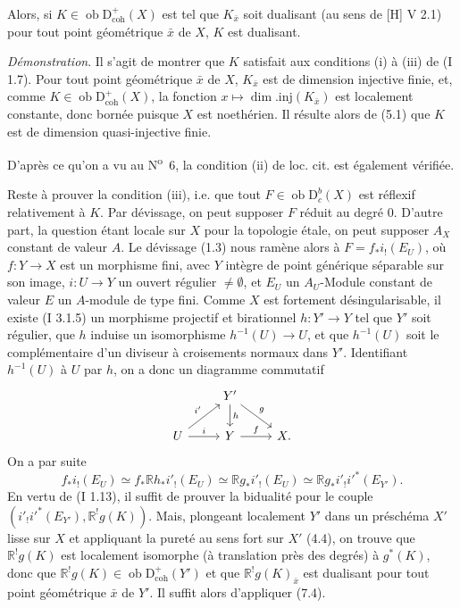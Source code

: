 \documentclass[11pt]{article}
\newcommand{\R}{\mathbb{R}}\newcommand{\RHomCore}{\mathbb{R}\mathrm{Hom}}
\newcommand{\D}{\mathrm{D}}
\newcommand{\ob}{\operatorname{ob}}
\providecommand{\ob}{\operatorname{ob}}
\providecommand{\R}{\mathrm R}
\begin{document}
Alors, si $K\in\ob\D^{+}_{\mathrm{coh}}(X)$ est tel que $K_{\bar{x}}$ soit dualisant (au sens de [H] V 2.1) pour tout point géométrique $\bar{x}$ de $X$, $K$ est dualisant.

\emph{Démonstration}. Il s'agit de montrer que $K$ satisfait aux conditions (i) à (iii) de (I 1.7). Pour tout point géométrique $\bar{x}$ de $X$, $K_{\bar{x}}$ est de
dimension injective finie, et, comme $K\in\ob\D^{+}_{\mathrm{coh}}(X)$, la fonction $x\mapsto \dim.\mathrm{inj}(K_{\bar{x}})$ est localement constante, donc bornée puisque $X$ est noethérien. Il résulte alors de (5.1) que $K$ est de dimension quasi-injective finie.

D'après ce qu'on a vu au N\textsuperscript{o}~6, la condition (ii) de loc. cit. est également vérifiée.

Reste à prouver la condition (iii), i.e. que tout $F\in\ob\D_c^b(X)$ est réflexif relativement à $K$. Par dévissage, on peut supposer $F$ réduit au degré $0$. D'autre part, la question étant locale sur $X$ pour la topologie étale, on peut supposer $A_X$ constant de valeur $A$. Le dévissage (1.3) nous ramène alors à $F=f_*i_!(E_U)$, où $f:Y\to X$ est un morphisme fini, avec $Y$ intègre de point générique séparable sur son image, $i:U\to Y$ un ouvert régulier $\neq\emptyset$, et $E_U$ un $A_U$-Module constant de valeur $E$ un $A$-module de type fini. Comme $X$ est fortement désingularisable, il existe (I 3.1.5) un morphisme projectif et birationnel $h:Y'\to Y$ tel que $Y'$ soit régulier, que $h$ induise un isomorphisme $h^{-1}(U)\to U$, et que $h^{-1}(U)$ soit le complémentaire d'un diviseur à croisements normaux dans $Y'$. Identifiant $h^{-1}(U)$ à $U$ par $h$, on a donc un diagramme commutatif
\[
\begin{tikzcd}
& Y' \arrow[d,"h"] \arrow[dr,"g"] & \\
U \arrow[ur,"i'"] \arrow[r,"i"] & Y \arrow[r,"f"] & X.
\end{tikzcd}
\]
On a par suite
\[
        f_*i_!(E_U)\simeq f_*\R h_* i'_!(E_U)\simeq \R g_* i'_!(E_U)\simeq \R g_* i'_! i'^*(E_{Y'}).
\]
En vertu de (I 1.13), il suffit de prouver la bidualité pour le couple 
$(i'_!i'^*(E_{Y'}),\R^!g(K))$. Mais, plongeant localement $Y'$ dans un préschéma $X'$
lisse sur $X$ et appliquant la pureté au sens fort sur $X'$ (4.4), on trouve que $\R^!g(K)$ est localement isomorphe (à translation près des degrés) à $g^*(K)$, donc que $\R^!g(K)\in\ob\D^{+}_{\mathrm{coh}}(Y')$ et que $\R^!g(K)_{\bar{x}}$ est dualisant pour tout point géométrique $\bar{x}$ de $Y'$. Il suffit alors d'appliquer (7.4).
\end{document}
